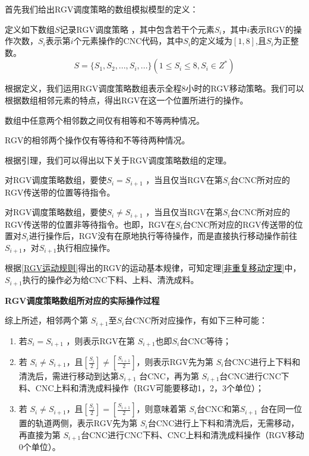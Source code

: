 \documentclass[withoutpreface,bwprint]{cumcmthesis} %
\begin{document}
首先我们给出RGV调度策略的数组模拟模型的定义：
\begin{definition}[RGV调度策略的数组] 
定义如下数组$S$记录RGV调度策略 ，其中包含若干个元素$S_i$，其中$i$表示RGV的操作次数，$S_i$表示第$i$个元素操作的CNC代码，其中$S_i$的定义域为$[ 1,8 ]$,且$S_i$为正整数。
\begin{equation}
S=\{S_1,S_2,...,S_i,...\}(1\leq S_i\leq 8,S_i\in Z^*)
\end{equation}
\end{definition}
根据定义，我们运用RGV调度策略数组表示全程8小时的RGV移动策略。我们可以根据数组相邻元素的特点，得出RGV在这一个位置所进行的操作。
\begin{lemma} 
数组中任意两个相邻数之间仅有相等和不等两种情况。
\label{引理1}
\end{lemma}
\begin{lemma} 
RGV的相邻两个操作仅有等待和不等待两种情况。
\label{引理2}
\end{lemma}
根据引理，我们可以得出以下关于RGV调度策略数组的定理。
\begin{theorem}[重复等待定理] 
对RGV调度策略数组，要使$S_i=S_{i+1}$ ，当且仅当RGV在第$S_i$台CNC所对应的RGV传送带的位置等待指令。
\end{theorem}
\begin{theorem}[非重复移动定理] 
对RGV调度策略数组，要使$S_i\neq S_{i+1}$ ，当且仅当RGV在第$S_i$台CNC所对应的RGV传送带的位置非等待指令。也即，RGV在$S_i$台CNC所对应的RGV传送带的位置对$S_i$进行操作后，RGV没有在原地执行等待操作，而是直接执行移动操作前往$S_{i+1}$，对$S_{i+1}$执行相应操作。
\label{非重复移动定理}
\end{theorem}


根据\ref{RGV运动规则}得出的RGV的运动基本规律，可知定理\ref{非重复移动定理}中，$S_{i+1}$执行的操作必为给CNC下料、上料、清洗成料。

\textbf{RGV调度策略数组所对应的实际操作过程}

综上所述，相邻两个第 $S_{i+1}$至$S_i$台CNC所对应操作，有如下三种可能：
\begin{enumerate}
\item 若$S_i=S_{i+1}$ ，则表示RGV在第 $S_{i+1}$也即$S_i$台CNC等待；
\item 若 $S_i\neq S_{i+1}$，且$[\frac{S_i}{2}]\neq[\frac{S_{i+1}}{2}]$，则表示RGV先为第 $S_i$台CNC进行上下料和清洗后，需进行移动到达第$S_{i+1}$ 台CNC，再为第 $S_{i+1}$台CNC进行CNC下料、CNC上料和清洗成料操作（RGV可能要移动1，2，3个单位）；
\item 若 $S_i\neq S_{i+1}$，且$[\frac{S_i}{2}]=[\frac{S_{i+1}}{2}]$，则意味着第  $S_i$台CNC和第$S_{i+1}$ 台在同一位置的轨道两侧，表示RGV先为第 $S_i$台CNC进行上下料和清洗后，无需移动，再直接为第 $S_{i+1}$台CNC进行CNC下料、CNC上料和清洗成料操作（RGV移动0个单位）。
\end{enumerate}
\end{document}
